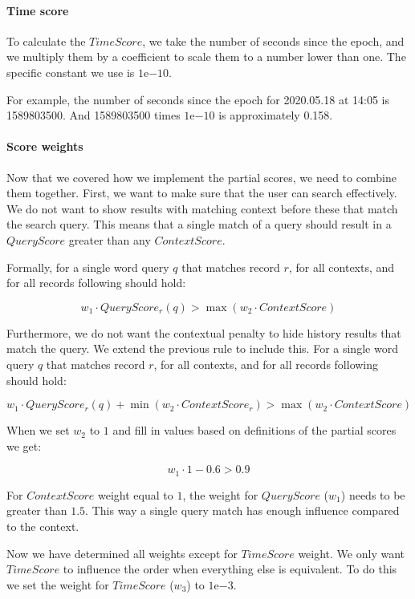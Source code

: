 \paragraph{Time score}


To calculate the \(TimeScore\), we take the number of seconds since the epoch, and we multiply them by a coefficient to scale them to a number lower than one. The specific constant we use is $1\mathrm{e}{-10}$.

For example, the number of seconds since the epoch for 2020.05.18 at 14:05 is 
1589803500. And 1589803500 times $1\mathrm{e}{-10}$ is approximately 0.158.


\paragraph{Score weights}


Now that we covered how we implement the partial scores, we need to combine them together.
First, we want to make sure that the user can search effectively. We do not want to show results with matching context before these that match the search query. This means that a single match of a query should result in a \(QueryScore\) greater than any \(ContextScore\).

Formally, for a single word query \(q\) that matches record \(r\), for all contexts, and for all records following should hold: 

\[ w_1 \cdot QueryScore_r(q) > \max{(w_2 \cdot ContextScore)} \]

Furthermore, we do not want the contextual penalty to hide history results that match the query. We extend the previous rule to include this. For a single word query \(q\) that matches record \(r\), for all contexts, and for all records following should hold:

\[ w_1 \cdot QueryScore_r(q) + \min{(w_2 \cdot ContextScore_r)} > \max{(w_2 \cdot ContextScore)} \]

When we set \(w_2\) to \(1\) and fill in values based on definitions of the partial scores we get:

\[ w_1 \cdot 1 - 0.6 > 0.9 \]

For \(ContextScore\) weight equal to \(1\), the weight for \(QueryScore\) (\(w_1\)) needs to be greater than \(1.5\). This way a single query match has enough influence compared to the context.

Now we have determined all weights except for \(TimeScore\) weight. We only want \(TimeScore\) to influence the order when everything else is equivalent. To do this we set the weight for \(TimeScore\) (\(w_3\)) to $1\mathrm{e}{-3}$.

